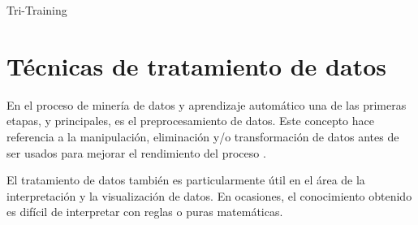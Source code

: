 \begin{algorithm}
    \DontPrintSemicolon
     \caption{Tri-Training}\label{pseudo:tri-training}
\end{algorithm}
\clearpage

\section{Técnicas de tratamiento de datos}

En el proceso de minería de datos y aprendizaje automático una de las primeras
etapas, y principales, es el preprocesamiento de datos. Este concepto hace
referencia a la manipulación,  eliminación y/o transformación de datos antes de
ser usados para mejorar el rendimiento del proceso \cite{enwiki:1138293751}.

El tratamiento de datos también es particularmente útil en el área de la
interpretación y la visualización de datos. En ocasiones, el conocimiento
obtenido es difícil de interpretar con reglas o puras matemáticas.

